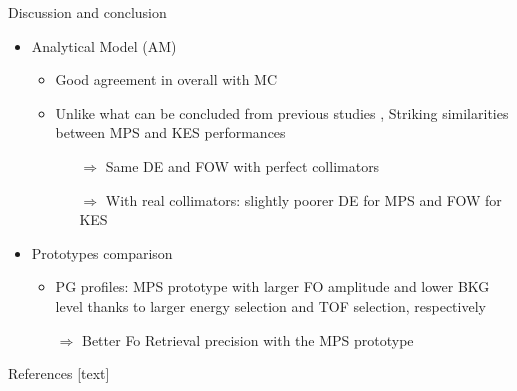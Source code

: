 \documentclass[final]{beamer} %
\begin{document}
\begin{frame}{}
\begin{columns}[t]
\begin{column}{0.49\textwidth}
	\begin{block}{Discussion and conclusion}	
		\begin{itemize}
			\item Analytical Model (AM)
			\begin{itemize}
				\item Good agreement in overall with MC
				\item Unlike what can be concluded from previous studies \cite{Smeets2016,Lin2016,Park2019}, Striking similarities between MPS and KES performances
				\begin{itemize}
					\item[$\Rightarrow$] Same DE and FOW with perfect collimators	
					\item[$\Rightarrow$] With real collimators: slightly poorer DE for MPS and FOW for KES 
				\end{itemize}			
			\end{itemize}

			\item Prototypes comparison
			\begin{itemize}
				\item PG profiles: MPS prototype with larger FO amplitude and lower BKG level thanks to larger energy selection and TOF selection, respectively
				\item[$\Rightarrow$] Better Fo Retrieval precision with the MPS	prototype	
			\end{itemize}			

		\end{itemize}

		
		
	\end{block}

		
	  \begin{block}{References}
	    \tiny
	    [text] 
%	    
	    
	    				


	  \end{block}		
		

	  
	  \vfill
	  
	\end{column}
	
\end{columns}

      
\end{frame}
\end{document}
